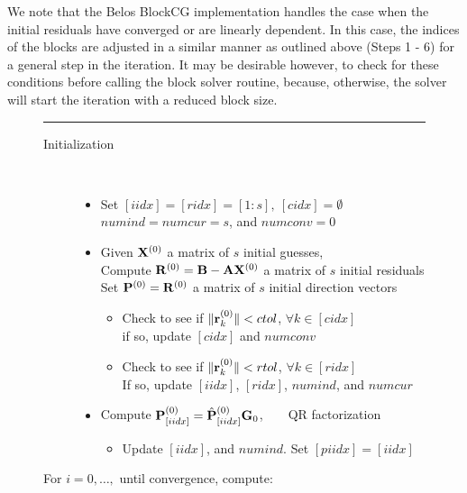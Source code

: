 \documentclass{article}
\newcommand{\bA}{{\bf A}}
\newcommand{\bB}{{\bf B}}
\newcommand{\bG}{{\bf G}}
\newcommand{\bP}{{\bf P}}
\newcommand{\bR}{{\bf R}}
\newcommand{\bX}{{\bf X}}
\newcommand{\br}{{\bf r}}
\begin{document}
We note that the Belos BlockCG implementation handles the case
when the initial residuals have converged or are linearly
dependent. In this case, the indices of the blocks are adjusted in
a similar manner as outlined above (Steps 1 - 6) for a general
step in the iteration. It may be desirable however, to check for
these conditions before calling the block solver routine, because,
otherwise, the solver will start the iteration with a reduced
block size.


{\small
\begin{figure}
\vspace{.05in} \hrule  \vspace{.1in}
\begin{description}
\item[Initialization] ~~~~
\begin{itemize}
 \item Set $[iidx] = [ridx] = [1:s], ~ [cidx] = \emptyset$ \\
 $numind = numcur = s$, and $numconv = 0$
 \item Given $\bX^{(0)}$ a matrix of $s$ initial guesses, \\
       Compute $\bR^{(0)} = \bB - \bA \bX^{(0)}$ a matrix of $s$
       initial residuals \\
       Set $\bP^{(0)} = \bR^{(0)}$ a matrix of $s$ initial
       direction vectors
       \begin{itemize}
       \item Check to see if $\| \br_k^{(0)} \| < ctol$, $\forall
       k \in [cidx]$ \\
       if so, update $[cidx]$ and $numconv$
       \item Check to see if $\| \br_k^{(0)} \| < rtol$, $\forall
       k \in [ridx]$ \\
       If so, update $[iidx]$, $[ridx]$, $numind$, and $numcur$
       \end{itemize}
 \item Compute $\bP^{(0)}_{[iidx]} = {\hat \bP}^{(0)}_{[iidx]}
 \bG_{0}$,~~~~QR factorization
 \begin{itemize}
 \item Update $[iidx]$, and $numind$. Set $[piidx] = [iidx]$
 \end{itemize}
 \end{itemize}
 \item[For $i=0,\ldots,$ until convergence, compute:]~~
\end{description}
\end{figure}}
\end{document}
